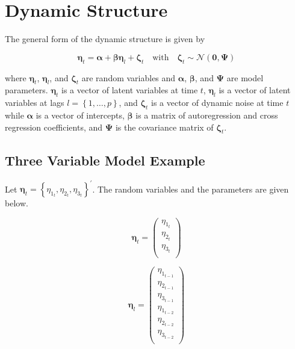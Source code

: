 \documentclass{article}
\begin{document}
\section{Dynamic Structure}

The general form of the dynamic structure is given by

\begin{equation}
    \boldsymbol{\eta}_{t}
    =
    \boldsymbol{\alpha}
    +
    \boldsymbol{\beta}
    \boldsymbol{\eta}_{l}
    +
    \boldsymbol{\zeta}_{t}
    \quad
    \mathrm{with}
    \quad
    \boldsymbol{\zeta}_{t}
    \sim
    \mathcal{N}
    \left(
    \mathbf{0},
    \boldsymbol{\Psi}
    \right)
\end{equation}

\noindent where $\boldsymbol{\eta}_{t}$, $\boldsymbol{\eta}_{l}$, and $\boldsymbol{\zeta}_{t}$ are random variables and $\boldsymbol{\alpha}$, $\boldsymbol{\beta}$, and $\boldsymbol{\Psi}$ are model parameters.
$\boldsymbol{\eta}_{t}$ is a vector of latent variables at time $t$, $\boldsymbol{\eta}_{l}$ is a vector of latent variables at lags $l = \left\{ 1, \dots, p \right\}$, and $\boldsymbol{\zeta}_{t}$ is a vector of dynamic noise at time $t$ while 
$\boldsymbol{\alpha}$ is a vector of intercepts, $\boldsymbol{\beta}$ is a matrix of autoregression and cross regression coefficients, and $\boldsymbol{\Psi}$ is the covariance matrix of $\boldsymbol{\zeta}_{t}$.

\subsection{Three Variable Model Example}

Let $\boldsymbol{\eta}_{t} = \left\{ \eta_{1_{t}}, \eta_{2_{t}}, \eta_{3_{t}} \right\}^{\prime}$. The random variables and the parameters are given below.

\begin{equation}
    \boldsymbol{\eta}_{t}
    =
    \left(
    \begin{array}{c}
        \eta_{1_{t}} \\
        \eta_{2_{t}} \\
        \eta_{3_{t}} \\
    \end{array}
    \right)
\end{equation}

\begin{equation}
    \boldsymbol{\eta}_{l}
    =
    \left(
    \begin{array}{c}
        \eta_{1_{t - 1}} \\
        \eta_{2_{t - 1}} \\
        \eta_{3_{t - 1}} \\
        \eta_{1_{t - 2}} \\
        \eta_{2_{t - 2}} \\
        \eta_{3_{t - 2}} \\
    \end{array}
    \right)
\end{equation}
\end{document}
